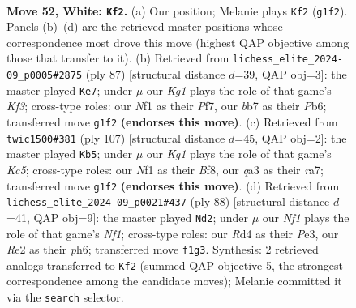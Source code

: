 \documentclass[11pt]{article}
\begin{document}
\clearpage

\begin{figure}[p]\centering
\begin{subfigure}{0.46\textwidth}\centering
\resizebox{\linewidth}{!}{%
\newchessgame
\chessboard[
  setfen={8/1b3pk1/5np1/8/3R3P/q7/4R2P/5NK1 w - - 11 52},
  showmover=false,
  pgfstyle=straightmove, color=movearrow, markmove={g1-f2}
]}
\caption{}
\end{subfigure}\hfill
\begin{subfigure}{0.46\textwidth}\centering
\resizebox{\linewidth}{!}{%
\newchessgame
\chessboard[
  setfen={8/5p2/1p3k2/1r5p/7P/5N2/5PK1/3R4 b - - 0 44},
  showmover=false,
  pgfstyle=straightmove, color=movearrow, markmove={f6-e7}
]}
\caption{}
\end{subfigure}
\\[4pt]
\begin{subfigure}{0.46\textwidth}\centering
\resizebox{\linewidth}{!}{%
\newchessgame
\chessboard[
  setfen={5b1B/R7/8/P1p2r1p/2k5/6P1/6KP/8 b - - 2 54},
  showmover=false,
  pgfstyle=straightmove, color=movearrow, markmove={c4-b5}
]}
\caption{}
\end{subfigure}\hfill
\begin{subfigure}{0.46\textwidth}\centering
\resizebox{\linewidth}{!}{%
\newchessgame
\chessboard[
  setfen={8/5kp1/5pnp/8/8/4P1PP/6K1/5N2 w - - 3 45},
  showmover=false,
  pgfstyle=straightmove, color=movearrow, markmove={f1-d2}
]}
\caption{}
\end{subfigure}
\caption{\textbf{Move 52, White: \texttt{Kf2}.} (a) Our position; Melanie plays \texttt{Kf2} (\texttt{g1f2}). Panels (b)--(d) are the retrieved master positions whose correspondence most drove this move (highest QAP objective among those that transfer to it). (b) Retrieved from \texttt{lichess\_elite\_2024-09\_p0005\#2875} (ply 87) [structural distance $d$=39, QAP obj=3]: the master played \texttt{Ke7}; under $\mu$ our \emph{Kg1} plays the role of that game's \emph{Kf3}; cross-type roles: our \emph{N}f1 as their \emph{P}f7, our \emph{b}b7 as their \emph{P}b6; transferred move \texttt{g1f2} \textbf{(endorses this move)}. (c) Retrieved from \texttt{twic1500\#381} (ply 107) [structural distance $d$=45, QAP obj=2]: the master played \texttt{Kb5}; under $\mu$ our \emph{Kg1} plays the role of that game's \emph{Kc5}; cross-type roles: our \emph{N}f1 as their \emph{B}f8, our \emph{q}a3 as their \emph{r}a7; transferred move \texttt{g1f2} \textbf{(endorses this move)}. (d) Retrieved from \texttt{lichess\_elite\_2024-09\_p0021\#437} (ply 88) [structural distance $d$=41, QAP obj=9]: the master played \texttt{Nd2}; under $\mu$ our \emph{Nf1} plays the role of that game's \emph{Nf1}; cross-type roles: our \emph{R}d4 as their \emph{P}e3, our \emph{R}e2 as their \emph{p}h6; transferred move \texttt{f1g3}. Synthesis: 2 retrieved analogs transferred to \texttt{Kf2} (summed QAP objective 5, the strongest correspondence among the candidate moves); Melanie committed it via the \texttt{search} selector.}
\label{fig:thought-m102}
\end{figure}
\end{document}
